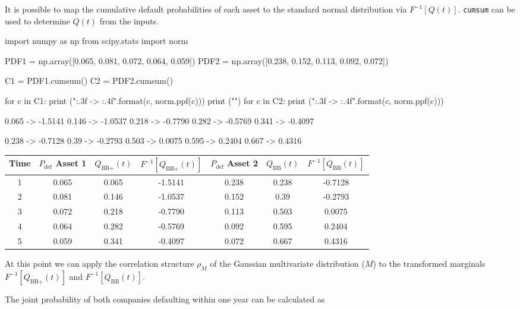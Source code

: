 \cprotEnv\begin{solution}
It is possible to map the cumulative default probabilities of each asset to the standard normal distribution via $F^{-1}[Q(t)]$.
\texttt{cumsum} can be used to determine $Q(t)$ from the inputs.

\begin{ipython}
import numpy as np
from scipy.stats import norm

PDF1 = np.array([0.065, 0.081, 0.072, 0.064, 0.059])
PDF2 = np.array([0.238, 0.152, 0.113, 0.092, 0.072])

C1 = PDF1.cumsum()
C2 = PDF2.cumsum()

for c in C1:
    print ("{:.3f} -> {:.4f}".format(c, norm.ppf(c)))
print ("")
for c in C2:
    print ("{:.3f} -> {:.4f}".format(c, norm.ppf(c)))
\end{ipython}
\begin{ioutput}
0.065 -> -1.5141
0.146 -> -1.0537
0.218 -> -0.7790
0.282 -> -0.5769
0.341 -> -0.4097

0.238 -> -0.7128
0.39 -> -0.2793
0.503 -> 0.0075
0.595 -> 0.2404
0.667 -> 0.4316
\end{ioutput}

\begin{table}[htbp]
\centering
\begin{tabular}{|c|c|c|c|c|c|c|}
\hline
Time & $P_{\mathrm{def}}$ Asset 1 & $Q_{\textrm{BB+}}(t)$ & $F^{-1}[Q_{\textrm{BB+}}(t)]$ & $P_{\mathrm{def}}$ Asset 2 & $Q_{\textrm{BB}}(t)$ & $F^{-1}[Q_{\textrm{BB}}(t)]$\\[5 pt]
\hline
\hline
1 & 0.065 & 0.065 & -1.5141 & 0.238 & 0.238 & -0.7128\\
2 & 0.081 & 0.146 & -1.0537 & 0.152 & 0.39 & -0.2793\\
3 & 0.072 & 0.218 & -0.7790 & 0.113 & 0.503 & 0.0075\\
4 & 0.064 & 0.282 & -0.5769 & 0.092 & 0.595 & 0.2404\\
5 & 0.059 & 0.341 & -0.4097 & 0.072 & 0.667 & 0.4316\\
\hline
\end{tabular}
\end{table}

At this point we can apply the correlation structure $\rho_M$ of the Gaussian multivariate distribution ($M$) to the transformed marginals $F^{-1}[Q_{\textrm{BB+}}(t)]$ and $F^{-1}[Q_{\textrm{BB}}(t)]$.

The joint probability of both companies defaulting within one year can be calculated as


\end{solution}
